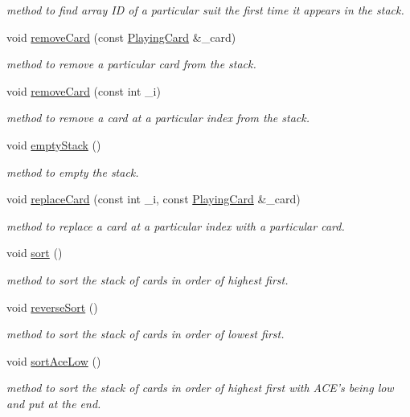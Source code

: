 \begin{DoxyCompactItemize}
\begin{DoxyCompactList}\small\item\em method to find array I\-D of a particular suit the first time it appears in the stack. \end{DoxyCompactList}\item 
void \hyperlink{classcardStack_a249c4de515785a81fd19e2c23535fd8e}{remove\-Card} (const \hyperlink{classPlayingCard}{Playing\-Card} \&\-\_\-card)
\begin{DoxyCompactList}\small\item\em method to remove a particular card from the stack. \end{DoxyCompactList}\item 
void \hyperlink{classcardStack_aaf7d09e9de876ab4757451ba16aef984}{remove\-Card} (const int \-\_\-i)
\begin{DoxyCompactList}\small\item\em method to remove a card at a particular index from the stack. \end{DoxyCompactList}\item 
void \hyperlink{classcardStack_a9b8066aebb82891f1eca0c43d1b71d97}{empty\-Stack} ()
\begin{DoxyCompactList}\small\item\em method to empty the stack. \end{DoxyCompactList}\item 
void \hyperlink{classcardStack_acb6eb23ed3e22aebee2afd493ffacda6}{replace\-Card} (const int \-\_\-i, const \hyperlink{classPlayingCard}{Playing\-Card} \&\-\_\-card)
\begin{DoxyCompactList}\small\item\em method to replace a card at a particular index with a particular card. \end{DoxyCompactList}\item 
void \hyperlink{classcardStack_ab9d64e6e9d98270c7d67ab6d1abda31f}{sort} ()
\begin{DoxyCompactList}\small\item\em method to sort the stack of cards in order of highest first. \end{DoxyCompactList}\item 
void \hyperlink{classcardStack_a02e2d031a74c553e2132188ece48b661}{reverse\-Sort} ()
\begin{DoxyCompactList}\small\item\em method to sort the stack of cards in order of lowest first. \end{DoxyCompactList}\item 
void \hyperlink{classcardStack_a3a345e0362dafd7f137e5441c3213419}{sort\-Ace\-Low} ()
\begin{DoxyCompactList}\small\item\em method to sort the stack of cards in order of highest first with A\-C\-E's being low and put at the end. \end{DoxyCompactList}\end{DoxyCompactItemize}
